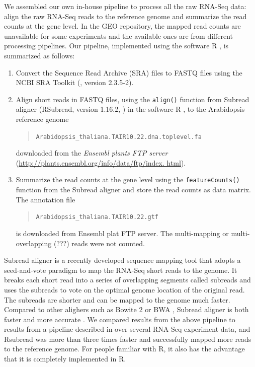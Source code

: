 \documentclass[letterpaper,12pt]{article}
\begin{document}
 
We assembled our own in-house pipeline to process all the raw RNA-Seq data:
align the raw RNA-Seq reads to the reference genome and summarize the read counts at the 
gene level. In the GEO repository, the
mapped read counts are unavailable for some experiments and the available ones
are from different processing pipelines.  
Our pipeline, implemented using the software R \citep{Rpackage}, is summarized as follows: 
\begin{enumerate}
    \item Convert the Sequence Read Archive (SRA) files to FASTQ files using the NCBI SRA Toolkit (\cite{leinonen2010sequence}, version 2.3.5-2). %
    \item
	Align short reads in FASTQ files,  using the \verb|align()| function from 
	Subread aligner (RSubread, version 1.16.2, \citealt{liao2013subread}) in the software R
	\citep{ Rpackage}, to the Arabidopsis reference genome
	   \begin{quote}
	   	\verb|Arabidopsis_thaliana.TAIR10.22.dna.toplevel.fa |
	   \end{quote} 
	downloaded from the \textit{ Ensembl plants FTP server} (\url{http://plants.ensembl.org/info/data/ftp/index. html}). 
	 


 \item
     Summarize the read counts at the gene level using the \verb|featureCounts()| function from the
     Subread aligner
     and store the read counts as data matrix.  
     The annotation file 
     \begin{quote}
     \verb"Arabidopsis_thaliana.TAIR10.22.gtf" 
 \end{quote}
     is
     downloaded from Ensembl plat FTP server. The multi-mapping or
     multi-overlapping (???) reads were not counted.  

\end{enumerate}
Subread aligner is a recently developed sequence mapping tool that adopts a
seed-and-vote paradigm to map the RNA-Seq short reads to the genome. 
It breaks each short read into a series of overlapping segments called
subreads and uses the subreads to vote on the optimal genome location of the
original read. The subreads are shorter and can be mapped to the genome much
faster.
Compared to other alighers such as Bowite 2 \citep{langmead2012fast} or BWA
\citep{li2009fast}, Subread aligner is both faster and more accurate
\citep{liao2013subread}. We compared results from the above
pipeline to results from a pipeline described in \cite{anders2013count} over several RNA-Seq experiment data, and Rsubread
was more than three times faster and successfully mapped more reads to the
reference genome.  For people familiar with R, it also has the advantage
that it is completely implemented in R.
\end{document}
